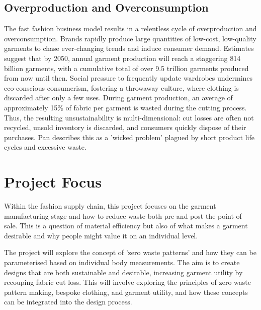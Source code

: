 \subsection{Overproduction and Overconsumption}
The fast fashion business model results in a relentless cycle of overproduction and overconsumption. Brands rapidly produce large quantities of low-cost, low-quality garments to chase ever-changing trends and induce consumer demand. Estimates suggest that by 2050, annual garment production will reach a staggering 814 billion garments, with a cumulative total of over 9.5 trillion garments produced from now until then. Social pressure to frequently update wardrobes undermines eco-conscious consumerism, fostering a throwaway culture, where clothing is discarded after only a few uses. During garment production, an average of approximately 15\% of fabric per garment is wasted during the cutting process. Thus, the resulting unsustainability is multi-dimensional: cut losses are often not recycled, unsold inventory is discarded, and consumers quickly dispose of their purchases. Pan describes this as a 'wicked problem' plagued by short product life cycles and excessive waste.

\section{Project Focus}
Within the fashion supply chain, this project focuses on the garment manufacturing stage and how to reduce waste both pre and post the point of sale. This is a question of material efficiency but also of what makes a garment desirable and why people might value it on an individual level. 

The project will explore the concept of 'zero waste patterns' and how they can be parameterised based on individual body measurements. The aim is to create designs that are both sustainable and desirable, increasing garment utility by recouping fabric cut loss. This will involve exploring the principles of zero waste pattern making, bespoke clothing, and garment utility, and how these concepts can be integrated into the design process. 

